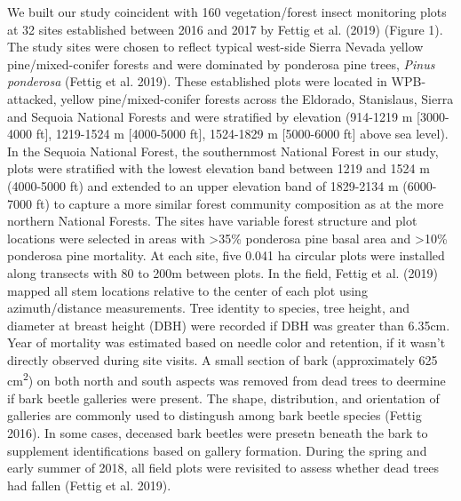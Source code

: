 \documentclass[]{article}
\begin{document}
We built our study coincident with 160 vegetation/forest insect
monitoring plots at 32 sites established between 2016 and 2017 by Fettig
et al. (2019) (Figure 1). The study sites were chosen to reflect typical
west-side Sierra Nevada yellow pine/mixed-conifer forests and were
dominated by ponderosa pine trees, \emph{Pinus ponderosa} (Fettig et al.
2019). These established plots were located in WPB-attacked, yellow
pine/mixed-conifer forests across the Eldorado, Stanislaus, Sierra and
Sequoia National Forests and were stratified by elevation (914-1219 m
{[}3000-4000 ft{]}, 1219-1524 m {[}4000-5000 ft{]}, 1524-1829 m
{[}5000-6000 ft{]} above sea level). In the Sequoia National Forest, the
southernmost National Forest in our study, plots were stratified with
the lowest elevation band between 1219 and 1524 m (4000-5000 ft) and
extended to an upper elevation band of 1829-2134 m (6000-7000 ft) to
capture a more similar forest community composition as at the more
northern National Forests. The sites have variable forest structure and
plot locations were selected in areas with \textgreater{}35\% ponderosa
pine basal area and \textgreater{}10\% ponderosa pine mortality. At each
site, five 0.041 ha circular plots were installed along transects with
80 to 200m between plots. In the field, Fettig et al. (2019) mapped all
stem locations relative to the center of each plot using
azimuth/distance measurements. Tree identity to species, tree height,
and diameter at breast height (DBH) were recorded if DBH was greater
than 6.35cm. Year of mortality was estimated based on needle color and
retention, if it wasn't directly observed during site visits. A small
section of bark (approximately 625 cm\textsuperscript{2}) on both north
and south aspects was removed from dead trees to deermine if bark beetle
galleries were present. The shape, distribution, and orientation of
galleries are commonly used to distingush among bark beetle species
(Fettig 2016). In some cases, deceased bark beetles were presetn beneath
the bark to supplement identifications based on gallery formation.
During the spring and early summer of 2018, all field plots were
revisited to assess whether dead trees had fallen (Fettig et al. 2019).
\end{document}
